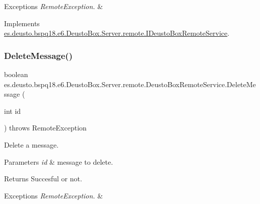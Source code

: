\begin{DoxyExceptions}{Exceptions}
{\em Remote\+Exception.} & \\
\hline
\end{DoxyExceptions}


Implements \mbox{\hyperlink{interfacees_1_1deusto_1_1bspq18_1_1e6_1_1_deusto_box_1_1_server_1_1remote_1_1_i_deusto_box_remote_service_ade1f67d916a6ad0e9d256aa60c80a8a7}{es.\+deusto.\+bspq18.\+e6.\+Deusto\+Box.\+Server.\+remote.\+I\+Deusto\+Box\+Remote\+Service}}.

\mbox{\label{classes_1_1deusto_1_1bspq18_1_1e6_1_1_deusto_box_1_1_server_1_1remote_1_1_deusto_box_remote_service_a1a954b90d573a76975631a924ed1601c}} 
\subsubsection{\texorpdfstring{Delete\+Message()}{DeleteMessage()}}
{\footnotesize\ttfamily boolean es.\+deusto.\+bspq18.\+e6.\+Deusto\+Box.\+Server.\+remote.\+Deusto\+Box\+Remote\+Service.\+Delete\+Message (\begin{DoxyParamCaption}\item[{int}]{id }\end{DoxyParamCaption}) throws Remote\+Exception}

Delete a message. 
\begin{DoxyParams}{Parameters}
{\em id} & message to delete. \\
\hline
\end{DoxyParams}
\begin{DoxyReturn}{Returns}
Succesful or not. 
\end{DoxyReturn}

\begin{DoxyExceptions}{Exceptions}
{\em Remote\+Exception.} & \\
\hline
\end{DoxyExceptions}


